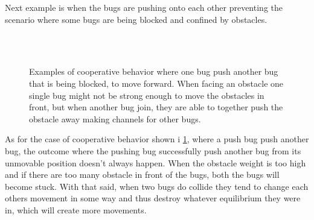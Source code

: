 Next example is when the bugs are pushing onto each other 
preventing the scenario where some bugs are being blocked 
and confined by obstacles.

\begin{figure}[htpb!]
\centering
\captionsetup[subfigure]{labelformat=empty}
 \quad
{} \quad
{} \quad
{} \\
 \quad
{} \quad
{} \quad
{} \\
 \quad
{} \quad
{} \quad
{}

\caption{Examples of cooperative behavior where one 
bug push another bug that is being blocked, to move forward. 
When facing an obstacle one single bug might not be strong 
enough to move the obstacles in front, but when another bug join, 
they are able to together push the obstacle away making channels for other bugs.
} 
\label{fig:CBP}
\end{figure}


As for the case of cooperative behavior shown i \cref{fig:CBP}, 
where a push bug push another bug, the outcome where the pushing 
bug successfully push another bug from its unmovable position 
doesn't always happen. When the obstacle weight is too high and 
if there are too many obstacle in front of the bugs, both the bugs 
will become stuck. With that said, when two bugs do collide 
they tend to change each others movement in some way and thus 
destroy whatever equilibrium they were in, which will create more movements.

